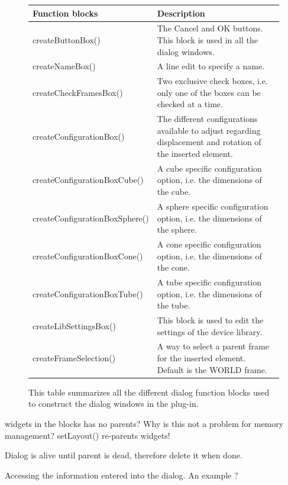 \begin{figure}[h]
\centering
\begin{center}
  \begin{tabular}{ | l | p{7cm} |}
    \hline
    \textbf{Function blocks} 	   &   \textbf{Description}  \\ \hline
    createButtonBox()			   &   The Cancel and OK buttons. This block is used in all the dialog windows.   		\\ \hline
    createNameBox() 			   &   A line edit to specify a name.   		\\ \hline
    createCheckFramesBox()		   &   Two exclusive check boxes, i.e. only one of the boxes can be checked at a time.		\\ \hline
    createConfigurationBox() 	   &   The different configurations available to adjust regarding displacement and rotation of the inserted element. 		\\ \hline
	createConfigurationBoxCube()   &   A cube specific configuration option, i.e. the dimensions of the cube.  	\\ \hline	    
	createConfigurationBoxSphere() &   A sphere specific configuration option, i.e. the dimensions of the sphere. 	\\ \hline	
	createConfigurationBoxCone()   &   A cone specific configuration option, i.e. the dimensions of the cone.  	\\ \hline	
    createConfigurationBoxTube()   &   A tube specific configuration option, i.e. the dimensions of the tube.  	\\ \hline	
	createLibSettingsBox()		   &   This block is used to edit the settings of the device library.    	\\ \hline	 
	createFrameSelection()		   &   A way to select a parent frame for the inserted element. Default is the WORLD frame.		\\
    \hline
  \end{tabular}
\end{center}
\caption{This table summarizes all the different dialog function blocks used to construct the dialog windows in the plug-in.}
\label{fig:dialogBlocks} 
\end{figure}



widgets in the blocks has no parents? Why is this not a problem for memory management? setLayout() re-parents widgets!

Dialog is alive until parent is dead, therefore delete it when done.

Accessing the information entered into the dialog. An example ?






